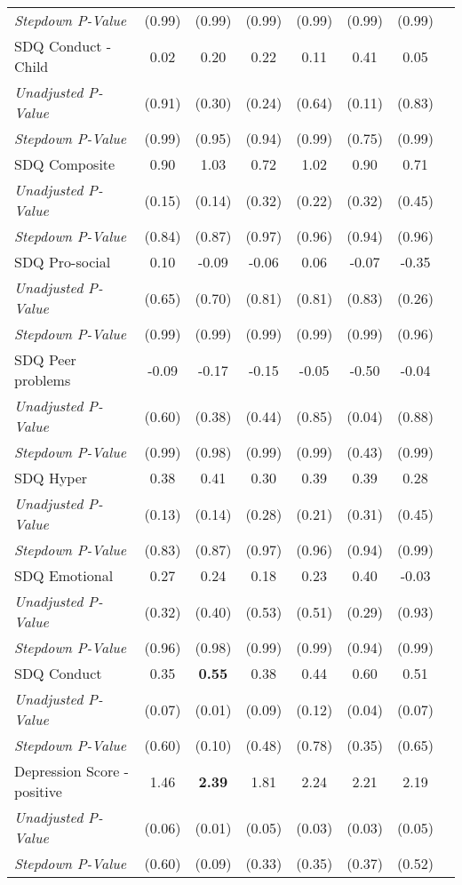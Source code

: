 \begin{tabular}{l c c c c c c c}
\quad \textit{Stepdown P-Value} & (0.99) & (0.99) & (0.99) & (0.99) & (0.99) & (0.99) \\
SDQ Conduct - Child & 0.02 & 0.20 & 0.22 & 0.11 & 0.41 & 0.05 \\
\quad \textit{Unadjusted P-Value} & (0.91) & (0.30) & (0.24) & (0.64) & (0.11) & (0.83) \\
\quad \textit{Stepdown P-Value} & (0.99) & (0.95) & (0.94) & (0.99) & (0.75) & (0.99) \\
SDQ Composite & 0.90 & 1.03 & 0.72 & 1.02 & 0.90 & 0.71 \\
\quad \textit{Unadjusted P-Value} & (0.15) & (0.14) & (0.32) & (0.22) & (0.32) & (0.45) \\
\quad \textit{Stepdown P-Value} & (0.84) & (0.87) & (0.97) & (0.96) & (0.94) & (0.96) \\
SDQ Pro-social & 0.10 & -0.09 & -0.06 & 0.06 & -0.07 & -0.35 \\
\quad \textit{Unadjusted P-Value} & (0.65) & (0.70) & (0.81) & (0.81) & (0.83) & (0.26) \\
\quad \textit{Stepdown P-Value} & (0.99) & (0.99) & (0.99) & (0.99) & (0.99) & (0.96) \\
SDQ Peer problems & -0.09 & -0.17 & -0.15 & -0.05 & -0.50 & -0.04 \\
\quad \textit{Unadjusted P-Value} & (0.60) & (0.38) & (0.44) & (0.85) & (0.04) & (0.88) \\
\quad \textit{Stepdown P-Value} & (0.99) & (0.98) & (0.99) & (0.99) & (0.43) & (0.99) \\
SDQ Hyper & 0.38 & 0.41 & 0.30 & 0.39 & 0.39 & 0.28 \\
\quad \textit{Unadjusted P-Value} & (0.13) & (0.14) & (0.28) & (0.21) & (0.31) & (0.45) \\
\quad \textit{Stepdown P-Value} & (0.83) & (0.87) & (0.97) & (0.96) & (0.94) & (0.99) \\
SDQ Emotional & 0.27 & 0.24 & 0.18 & 0.23 & 0.40 & -0.03 \\
\quad \textit{Unadjusted P-Value} & (0.32) & (0.40) & (0.53) & (0.51) & (0.29) & (0.93) \\
\quad \textit{Stepdown P-Value} & (0.96) & (0.98) & (0.99) & (0.99) & (0.94) & (0.99) \\
SDQ Conduct & 0.35 & \textbf{ 0.55 } & 0.38 & 0.44 & 0.60 & 0.51 \\
\quad \textit{Unadjusted P-Value} & (0.07) & (0.01) & (0.09) & (0.12) & (0.04) & (0.07) \\
\quad \textit{Stepdown P-Value} & (0.60) & (0.10) & (0.48) & (0.78) & (0.35) & (0.65) \\
Depression Score - positive & 1.46 & \textbf{ 2.39 } & 1.81 & 2.24 & 2.21 & 2.19 \\
\quad \textit{Unadjusted P-Value} & (0.06) & (0.01) & (0.05) & (0.03) & (0.03) & (0.05) \\
\quad \textit{Stepdown P-Value} & (0.60) & (0.09) & (0.33) & (0.35) & (0.37) & (0.52) \\
\bottomrule
\end{tabular}
